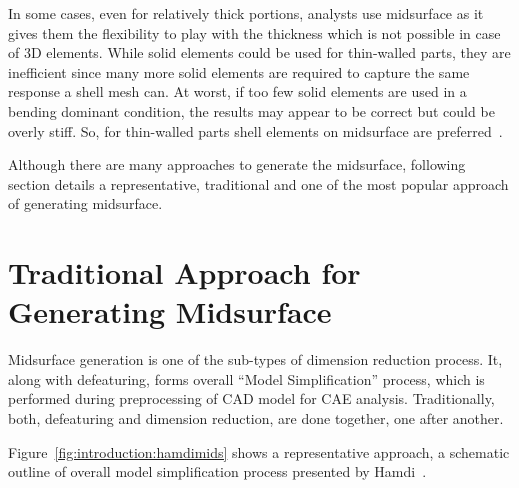 In some cases, even for relatively thick portions, analysts use midsurface as it gives them the flexibility to play with the thickness which is not possible in case of 3D elements. While solid elements could be used for thin-walled parts, they are inefficient since many more solid elements are required to capture the same response a shell mesh can. At worst, if too few solid elements are used in a bending dominant condition, the results may appear to be correct but could be overly stiff. So, for thin-walled parts shell elements on midsurface are preferred~\cite{Cosmos2006}.
	
Although there are many approaches to generate the midsurface, following section details a representative, traditional and one of the most popular approach of generating midsurface.
	
\section{Traditional Approach for Generating Midsurface}


Midsurface generation is one of the sub-types of dimension reduction process. It, along with defeaturing, forms overall ``Model Simplification'' process, which is performed during preprocessing of CAD model for CAE analysis. Traditionally, both, defeaturing and dimension reduction, are done together, one after another.



Figure~\ref{fig:introduction:hamdimids} shows a representative approach, a schematic outline of overall model simplification process presented by Hamdi~\cite{Hamdi2005, Hamdi2007, Hamdi2009, Hamdi2010, Hamdi2012}.

